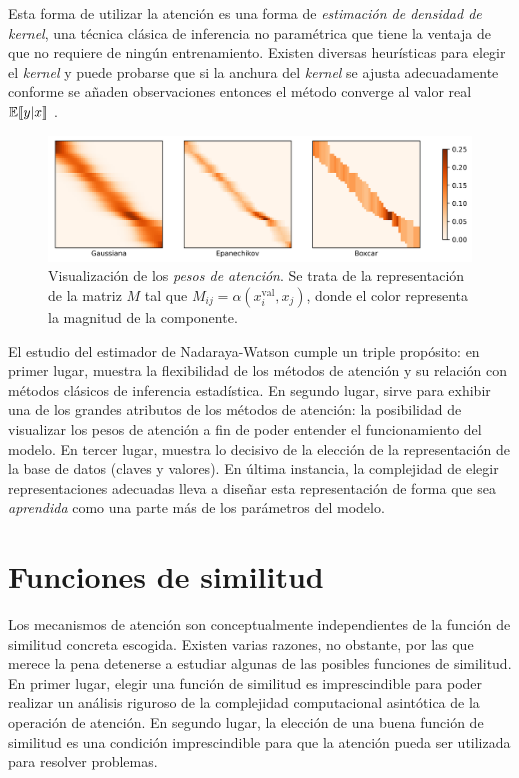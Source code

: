 Esta forma de utilizar la atención es una forma de \textit{estimación de densidad de kernel}, una técnica clásica de inferencia no paramétrica que tiene la ventaja de que no requiere de ningún entrenamiento. Existen diversas heurísticas para elegir el \textit{kernel} \cite{silverman1986density} y puede probarse que si la anchura del \textit{kernel} se ajusta adecuadamente conforme se añaden observaciones entonces el método converge al valor real \( \operatorname{\mathbb{E}} \llbracket y | x \rrbracket \) \cite{mack1982weak}.

\begin{figure}[tb]
    \centering
    \includegraphics[width=\textwidth]{figures/chapter4/heatmap.png}
    \caption{Visualización de los \textit{pesos de atención}. Se trata de la representación de la matriz \( M \) tal que \( M_{ij} = \alpha(x^\text{val}_{i}, x_j) \), donde el color representa la magnitud de la componente.}
    \label{fig:kernel}
\end{figure}

El estudio del estimador de Nadaraya-Watson cumple un triple propósito: en primer lugar, muestra la flexibilidad de los métodos de atención y su relación con métodos clásicos de inferencia estadística. En segundo lugar, sirve para exhibir una de los grandes atributos de los métodos de atención: la posibilidad de visualizar los pesos de atención a fin de poder entender el funcionamiento del modelo. En tercer lugar, muestra lo decisivo de la elección de la representación de la base de datos (claves y valores). En última instancia, la complejidad de elegir representaciones adecuadas lleva a diseñar esta representación de forma que sea \textit{aprendida} como una parte más de los parámetros del modelo.

\section{Funciones de similitud}
Los mecanismos de atención son conceptualmente independientes de la función de similitud concreta escogida. Existen varias razones, no obstante, por las que merece la pena detenerse a estudiar algunas de las posibles funciones de similitud. En primer lugar, elegir una función de similitud es imprescindible para poder realizar un análisis riguroso de la complejidad computacional asintótica de la operación de atención. En segundo lugar, la elección de una buena función de similitud es una condición imprescindible para que la atención pueda ser utilizada para resolver problemas.

